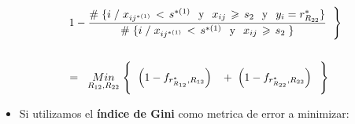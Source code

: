 \documentclass[
  11pt,
  a4paper,
]{article}
\providecommand{\tightlist}{%
  \setlength{\itemsep}{0pt}\setlength{\parskip}{0pt}}
\begin{document}
\begin{gather*}
\hspace{0.4cm}   1 -  \dfrac{\# \hspace{0.1 cm}\lbrace i \hspace{0.1 cm}/\hspace{0.1 cm}  x_{ij^{*(1)}} \hspace{0.05cm}   < \hspace{0.05cm} s^{*(1)} \hspace{0.25 cm}\text{y}\hspace{0.25 cm} x_{ij} \hspace{0.05cm}   \geqslant \hspace{0.05cm} s_2 \hspace{0.25 cm}\text{y}\hspace{0.25 cm} y_i = r^*_{R_{22}} \rbrace}{\# \hspace{0.1 cm}\lbrace i \hspace{0.1 cm} / \hspace{0.1 cm}  x_{ij^{*(1)}} \hspace{0.05cm}   < \hspace{0.05cm} s^{*(1)} \hspace{0.25 cm}\text{y}\hspace{0.25 cm} x_{ij} \hspace{0.05cm}   \geqslant \hspace{0.05cm} s_2  \hspace{0.1 cm} \rbrace }    \hspace{0.2cm}  \Biggl\} \\  \\
=\hspace{0.2cm} \underset{R_{12}  ,  R_{22} }  {Min} \hspace{0.1cm} \Biggl\{  \hspace{0.2cm}  \left( 1 - f_{r^*_{R_{12}} , R_{12}} \right)  \hspace{0.3cm} +  \hspace{0.1cm}       \left( 1 - f_{r^*_{R_{22}} , R_{22}} \right)   \hspace{0.2cm}  \Biggl\}
\end{gather*}

\newpage

\begin{itemize}
\tightlist
\item
  Si utilizamos el \textbf{índice de Gini} como metrica de error a
  minimizar:
\end{itemize}
\end{document}

